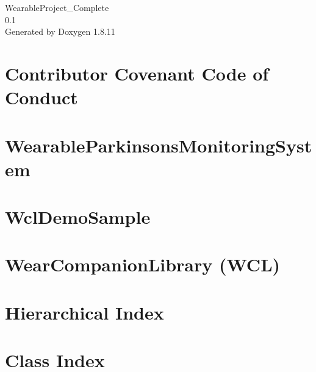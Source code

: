 \documentclass[twoside]{book}
\newcommand{\+}{\discretionary{\mbox{\scriptsize$\hookleftarrow$}}{}{}}
\newcommand{\clearemptydoublepage}{%
  \newpage{\pagestyle{empty}\cleardoublepage}%
}
\begin{document}
\hypersetup{pageanchor=false,
             bookmarksnumbered=true,
             pdfencoding=unicode
            }
\begin{titlepage}
\vspace*{7cm}
\begin{center}%
{\Large Wearable\+Project\+\_\+\+Complete \\[1ex]\large 0.\+1 }\\
\vspace*{1cm}
{\large Generated by Doxygen 1.8.11}\\
\end{center}
\end{titlepage}
\clearemptydoublepage
\tableofcontents
\clearemptydoublepage
{}
\hypersetup{pageanchor=true}

\chapter{Contributor Covenant Code of Conduct}
\label{md_CODE_OF_CONDUCT}
\hypertarget{md_CODE_OF_CONDUCT}{}

\chapter{Wearable\+Parkinsons\+Monitoring\+System}
\label{md_README}
\hypertarget{md_README}{}

\chapter{Wcl\+Demo\+Sample}
\label{md_WearableProject_Complete_WclDemoSample_README}
\hypertarget{md_WearableProject_Complete_WclDemoSample_README}{}

\chapter{Wear\+Companion\+Library (W\+CL)}
\label{md_WearableProject_Complete_WearCompanionLibrary_README}
\hypertarget{md_WearableProject_Complete_WearCompanionLibrary_README}{}

\chapter{Hierarchical Index}

\chapter{Class Index}

\end{document}
